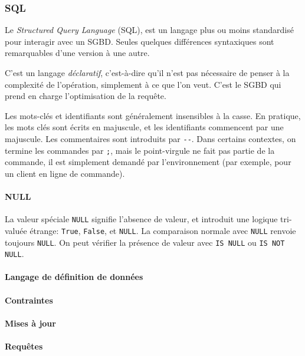 \documentclass[french, toc]{../cs-classes/cs-classes}
\begin{document}
\subsubsection{SQL}
Le \emph{Structured Query Language} (SQL), est un langage plus ou moins standardisé pour interagir avec un SGBD. Seules quelques différences syntaxiques sont remarquables d'une version à une autre. 

C'est un langage \emph{déclaratif}, c'est-à-dire qu'il n'est pas nécessaire de penser à la complexité de l'opération, simplement à ce que l'on veut. C'est le SGBD qui prend en charge l'optimisation de la requête.

Les mots-clés et identifiants sont généralement insensibles à la casse. En pratique, les mots clés sont écrits en majuscule, et les identifiants commencent par une majuscule. Les commentaires sont introduits par \texttt{-}\texttt{-}. Dans certains contextes, on termine les commandes par \texttt{;}, mais le point-virgule ne fait pas partie de la commande, il est simplement demandé par l'environnement (par exemple, pour un client en ligne de commande).

\paragraph*{NULL} La valeur spéciale \texttt{NULL} signifie l'absence de valeur, et introduit une logique tri-valuée étrange: \texttt{True}, \texttt{False}, et \texttt{NULL}. La comparaison normale avec \texttt{NULL} renvoie toujours \texttt{NULL}. On peut vérifier la présence de valeur avec \texttt{IS NULL} ou \texttt{IS NOT NULL}.

\paragraph*{Langage de définition de données}

\paragraph*{Contraintes}

\paragraph*{Mises à jour}

\paragraph*{Requêtes}
\end{document}
